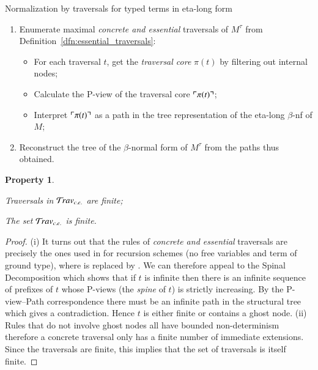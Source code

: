 \documentclass{elsarticle}
\theoremstyle{plain}
\newtheorem{property}[theorem]{Property}
\theoremstyle{definition}
\newcommand{\travsetcones}{{\travset_{c.e.}}} %
\def\coresymbol{\pi} %
\newcommand{\core}[1]{\coresymbol(#1)} %
\begin{document}
\begin{algorithm}[!ht]
\caption{Normalization by traversals for typed terms in eta-long form}
\label{algo:stlc_normalization_by_traversals}
\begin{algorithmic}
\begin{enumerate}[nosep]
  \item Enumerate maximal \emph{concrete and essential} traversals of $M^\tau$ from Definition~\ref{dfn:essential_traversals}:
  \begin{itemize}[nosep]
  \item For each traversal $t$, get the \emph{traversal core} $\core{t}$ by filtering out internal nodes;
  \item Calculate the P-view of the traversal core $\pview{\core{t}}$;
  \item Interpret $\pview{\core{t}}$ as a path in the tree representation of the eta-long $\beta$-nf of $M$;
  \end{itemize}
  \item Reconstruct the tree of the $\beta$-normal form of $M^\tau$ from the paths thus obtained.
\end{enumerate}
\end{algorithmic}
\end{algorithm}

\begin{property}
    \label{prop:concrete_essential_trav_finite}
    \begin{enumerate*}
        \item[(i)] Traversals in $\travsetcones$ are finite;
        \item[(ii)] The set $\travsetcones$ is finite.
    \end{enumerate*}
    \end{property}
    \begin{proof}
    (i) It turns out that the rules of \emph{concrete and essential} traversals are precisely the ones used in \cite{OngLics2006} for recursion schemes (no free variables and term of ground type), where  is replaced by . We can therefore appeal to the Spinal Decomposition
    \cite[Lemma 8]{OngLics2006} which shows that if $t$ is infinite then there is an infinite sequence of prefixes of $t$ whose P-views (the \emph{spine} of $t$) is strictly increasing. By the P-view--Path correspondence there must be an infinite path in the structural tree which gives a contradiction. Hence $t$ is either finite or contains a ghost node.
    (ii) Rules that do not involve ghost nodes all have bounded non-determinism therefore a concrete traversal only has a finite number of immediate extensions. Since the traversals are finite, this implies that the set of traversals is itself finite.
\end{proof}
\end{document}
